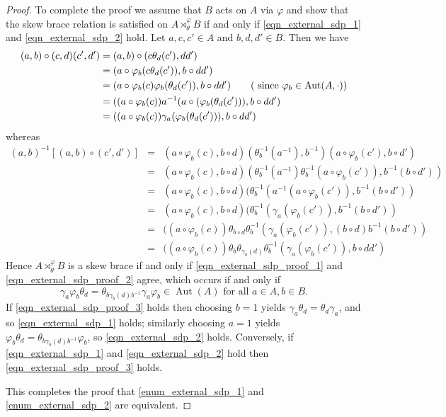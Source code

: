 \documentclass[12pt,a4paper, reqno]{amsart}
\theoremstyle{definition}
\DeclareMathOperator{\Aut}{\mbox{Aut}}
\begin{document}
\begin{proof}
To complete the proof we assume that $ B $ acts on $ A $ via $ \varphi $ and show that the skew brace relation is satisfied on $ A \rtimes_{\theta}^{\varphi} B $ if and only if \eqref{eqn_external_sdp_1} and \eqref{eqn_external_sdp_2} hold. Let $ a,c,c' \in A $ and $ b,d,d' \in B $. Then we have
\begin{align}
(a,b) \circ (c,d)(c',d') &= (a,b) \circ (c \theta_{d}(c'), dd') \nonumber \\
&= (a \circ \varphi_{b}(c\theta_{d}(c')), b \circ dd') \nonumber \\
&= (a \circ \varphi_{b}(c)\varphi_{b}(\theta_{d}(c')), b \circ dd') \tag{ since   $\varphi_{b} \in \Aut(A,\cdot)$}\nonumber \\
&= ((a \circ \varphi_{b}(c)) a^{-1} (a \circ (\varphi_{b}(\theta_{d}(c'))), b \circ dd') \nonumber \\
&= ((a \circ \varphi_{b}(c)) \gamma_{a}(\varphi_{b}(\theta_{d}(c'))), b \circ dd') \label{eqn_external_sdp_proof_1}
\end{align}
whereas
\begin{eqnarray}
[(a,b) \circ (c,d)](a,b)^{-1}[(a,b) \circ (c',d')] 
& = & (a \circ \varphi_{b}(c), b \circ d)(\theta_{b}^{-1}(a^{-1}),b^{-1})(a \circ \varphi_{b}(c'),b \circ d') \nonumber \\
& = & (a \circ \varphi_{b}(c), b \circ d)(\theta_{b}^{-1}(a^{-1})\theta_{b}^{-1}(a \circ \varphi_{b}(c')),b^{-1}(b \circ d')) \nonumber \\
& = & (a \circ \varphi_{b}(c), b \circ d)(\theta_{b}^{-1}(a^{-1}(a \circ \varphi_{b}(c')),b^{-1}(b \circ d')) \nonumber \\
& = & (a \circ \varphi_{b}(c), b \circ d)(\theta_{b}^{-1}(\gamma_{a}(\varphi_{b}(c')),b^{-1}(b \circ d')) \nonumber \\
& = & ((a \circ \varphi_{b}(c)) \theta_{b \circ d}\theta_{b}^{-1}(\gamma_{a}(\varphi_{b}(c')),(b \circ d)b^{-1}(b \circ d')) \nonumber \\
& = & ((a \circ \varphi_{b}(c)) \theta_{b}\theta_{\gamma_{b}(d)}\theta_{b}^{-1}(\gamma_{a}(\varphi_{b}(c')),b \circ dd') \label{eqn_external_sdp_proof_2}
\end{eqnarray}
Hence $ A \rtimes_{\theta}^{\varphi} B $ is a skew brace if and only if \eqref{eqn_external_sdp_proof_1} and \eqref{eqn_external_sdp_proof_2} agree, which occurs if and only if
\begin{equation} \label{eqn_external_sdp_proof_3}
\gamma_{a}\varphi_{b}\theta_{d} = \theta_{b\gamma_{b}(d)b^{-1}}\gamma_{a}\varphi_{b} \in \Aut(A) \mbox{ for all } a \in A, b \in B.
\end{equation}
If \eqref{eqn_external_sdp_proof_3} holds then choosing $ b=1 $ yields $ \gamma_{a} \theta_{d} = \theta_{d}\gamma_{a} $, and so \eqref{eqn_external_sdp_1} holds; similarly choosing $ a=1 $ yields $ \varphi_{b}\theta_{d} = \theta_{b\gamma_{b}(d)b^{-1}}\varphi_{b} $, so \eqref{eqn_external_sdp_2} holds. Conversely, if \eqref{eqn_external_sdp_1} and \eqref{eqn_external_sdp_2} hold then \eqref{eqn_external_sdp_proof_3} holds. 

This completes the proof that \ref{enum_external_sdp_1} and \ref{enum_external_sdp_2} are equivalent.
\end{proof}
\end{document}
